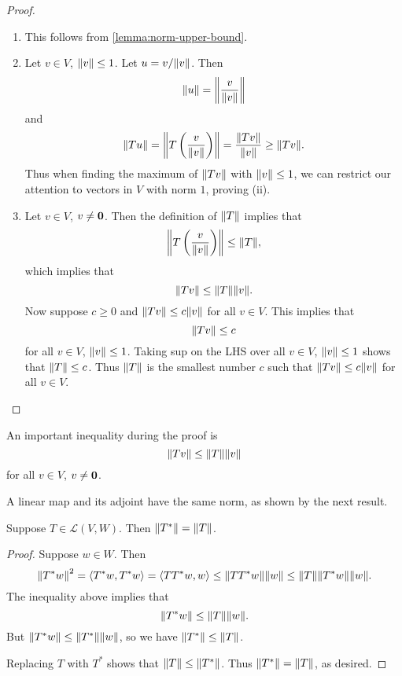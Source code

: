 \begin{proof} \
\begin{enumerate}[label=(\roman*)]
\item This follows from \ref{lemma:norm-upper-bound}.
\item Let $v\in V$, $\norm{v}\le1$. Let $u=v/\norm{v}$. Then
\[\norm{u}=\norm{\frac{v}{\norm{v}}}\]
and
\[\norm{Tu}=\norm{T\left(\frac{v}{\norm{v}}\right)}=\frac{\norm{Tv}}{\norm{v}}\ge\norm{Tv}.\]
Thus when finding the maximum of $\norm{Tv}$ with $\norm{v}\le1$, we can restrict our attention to vectors in $V$ with norm $1$, proving (ii).
\item Let $v\in V$, $v\neq\vb{0}$. Then the definition of $\norm{T}$ implies that
\[\norm{T\left(\frac{v}{\norm{v}}\right)}\le\norm{T},\]
which implies that
\[\norm{Tv}\le\norm{T}\norm{v}.\]
Now suppose $c\ge0$ and $\norm{Tv}\le c\norm{v}$ for all $v\in V$. This implies that
\[\norm{Tv}\le c\]
for all $v\in V$, $\norm{v}\le1$. Taking sup on the LHS over all $v\in V$, $\norm{v}\le1$ shows that $\norm{T}\le c$.
Thus $\norm{T}$ is the smallest number $c$ such that $\norm{Tv}\le c\norm{v}$ for all $v\in V$. 
\end{enumerate}
\end{proof}

An important inequality during the proof is
\begin{equation}
\norm{Tv}\le\norm{T}\norm{v}
\end{equation}
for all $v\in V$, $v\neq\vb{0}$.

A linear map and its adjoint have the same norm, as shown by the next result.

\begin{lemma}
Suppose $T\in\mathcal{L}(V,W)$. Then $\norm{T^*}=\norm{T}$.
\end{lemma}

\begin{proof}
Suppose $w\in W$. Then
\[\norm{T^*w}^2=\left\langle T^*w,T^*w\right\rangle=\left\langle TT^*w,w\right\rangle\le\norm{TT^*w}\norm{w}\le\norm{T}\norm{T^*w}\norm{w}.\]
The inequality above implies that
\[\norm{T^*w}\le\norm{T}\norm{w}.\]
But $\norm{T^*w}\le\norm{T^*}\norm{w}$, so we have $\norm{T^*}\le\norm{T}$.

Replacing $T$ with $T^*$ shows that $\norm{T}\le\norm{T^*}$. Thus $\norm{T^*}=\norm{T}$, as desired.
\end{proof}

